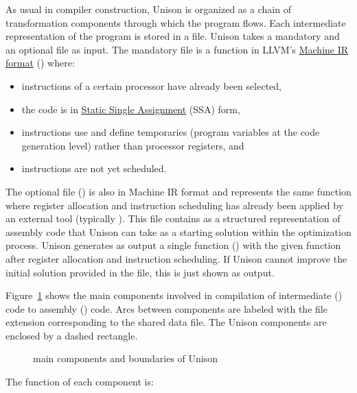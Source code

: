 \documentclass[11pt]{report}
\begin{document}
As usual in compiler construction, Unison is organized as a chain of
transformation components through which the program flows.
%
Each intermediate representation of the program is stored in a file.
%
Unison takes a mandatory and an optional file as input.
%
The mandatory file is a function in LLVM's
\href{http://llvm.org/docs/MIRLangRef.html}{Machine IR format} ()
where:
%
\begin{itemize}
\item instructions of a certain processor have already been selected,
\item the code is in
  \href{https://en.wikipedia.org/wiki/Static_single_assignment_form}{Static
    Single Assignment} (SSA) form,
\item instructions use and define temporaries (program variables at the code
  generation level) rather than processor registers, and
\item instructions are not yet scheduled.
\end{itemize}
%
The optional file () is also in Machine IR format and represents
the same function where register allocation and instruction scheduling has
already been applied by an external tool (typically ).
%
This file contains as a structured representation of assembly code that Unison
can take as a starting solution within the optimization process.
%
Unison generates as output a single function () with the given
function after register allocation and instruction scheduling.
%
If Unison cannot improve the initial solution provided in the 
file, this is just shown as output.

Figure~\ref{fig:components} shows the main components involved in compilation of
intermediate () code to assembly () code.
%
Arcs between components are labeled with the file extension corresponding to the
shared data file.
%
The Unison components are enclosed by a dashed rectangle.

\begin{figure}[H]
  \centering
  \scalebox{0.65}{}
  \caption{main components and boundaries of Unison}
  \label{fig:components}
\end{figure}

The function of each component is:
\end{document}
